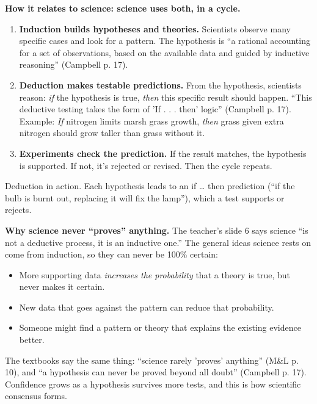 \documentclass[11pt,letterpaper]{article}
\begin{document}
\textbf{How it relates to science: science uses both, in a cycle.}

\begin{enumerate}
  \item \textbf{Induction builds hypotheses and theories.} Scientists observe many specific cases and look for a pattern. The hypothesis is ``a rational accounting for a set of observations, based on the available data and guided by inductive reasoning'' (Campbell p. 17).
  \item \textbf{Deduction makes testable predictions.} From the hypothesis, scientists reason: \emph{if} the hypothesis is true, \emph{then} this specific result should happen. ``This deductive testing takes the form of 'If . . . then' logic'' (Campbell p. 17). Example: \emph{If} nitrogen limits marsh grass growth, \emph{then} grass given extra nitrogen should grow taller than grass without it.
  \item \textbf{Experiments check the prediction.} If the result matches, the hypothesis is supported. If not, it's rejected or revised. Then the cycle repeats.
\end{enumerate}

  {Deduction in action. Each hypothesis leads to an if \dots{} then prediction (``if the bulb is burnt out, replacing it will fix the lamp''), which a test supports or rejects.}

\textbf{Why science never ``proves'' anything.} The teacher's slide 6 says science ``is not a deductive process, it is an inductive one.'' The general ideas science rests on come from induction, so they can never be 100\% certain:
\begin{itemize}
  \item More supporting data \emph{increases the probability} that a theory is true, but never makes it certain.
  \item New data that goes against the pattern can reduce that probability.
  \item Someone might find a pattern or theory that explains the existing evidence better.
\end{itemize}

The textbooks say the same thing: ``science rarely 'proves' anything'' (M\&L p. 10), and ``a hypothesis can never be proved beyond all doubt'' (Campbell p. 17). Confidence grows as a hypothesis survives more tests, and this is how scientific consensus forms.
\end{document}
